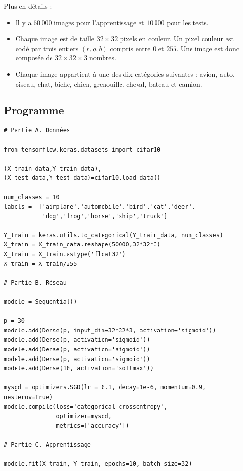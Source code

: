 \documentclass[11pt,class=report,crop=false]{standalone}
\begin{document}
Plus en détails :
\begin{itemize}
  \item  Il y a $50\,000$ images pour l'apprentissage et $10\,000$ pour les tests.
  \item Chaque image est de taille $32\times 32$ pixels en couleur. 
  Un pixel couleur est codé par trois entiers $(r,g,b)$ compris entre $0$ et $255$.
  Une image est donc composée de $32\times32\times3$ nombres.
  
  \item Chaque image appartient à une des dix catégories suivantes : avion, auto, oiseau, chat, biche, chien, grenouille, cheval, bateau et camion.
\end{itemize}


\subsection{Programme}

\begin{lstlisting}
# Partie A. Données

from tensorflow.keras.datasets import cifar10

(X_train_data,Y_train_data),(X_test_data,Y_test_data)=cifar10.load_data()

num_classes = 10
labels =  ['airplane','automobile','bird','cat','deer',
           'dog','frog','horse','ship','truck']

Y_train = keras.utils.to_categorical(Y_train_data, num_classes)
X_train = X_train_data.reshape(50000,32*32*3)
X_train = X_train.astype('float32')
X_train = X_train/255

# Partie B. Réseau 

modele = Sequential()

p = 30
modele.add(Dense(p, input_dim=32*32*3, activation='sigmoid'))
modele.add(Dense(p, activation='sigmoid'))
modele.add(Dense(p, activation='sigmoid'))
modele.add(Dense(p, activation='sigmoid'))
modele.add(Dense(10, activation='softmax'))

mysgd = optimizers.SGD(lr = 0.1, decay=1e-6, momentum=0.9, nesterov=True)
modele.compile(loss='categorical_crossentropy',
               optimizer=mysgd,
               metrics=['accuracy'])

# Partie C. Apprentissage

modele.fit(X_train, Y_train, epochs=10, batch_size=32)
\end{lstlisting}
\end{document}

